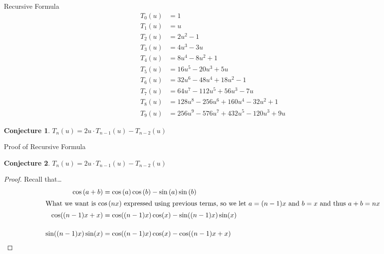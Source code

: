 \documentclass{beamer}
\newtheorem{conjecture}{Conjecture}
\begin{document}
\begin{frame}{Recursive Formula}
 \vspace{-18pt}
 \tiny{}
 \begin{align*}
  T_0(u) & = 1                                      \\
  T_1(u) & = u                                      \\
  T_2(u) & = 2u^2 - 1                               \\
  T_3(u) & = 4u^3 - 3u                              \\
  T_4(u) & = 8u^4 - 8 u^2 + 1                       \\
  T_5(u) & = 16u^5 - 20u^3 + 5u                     \\
  T_6(u) & = 32u^6 - 48u^4 + 18u^2 - 1              \\
  T_7(u) & = 64u^7 - 112u^5 + 56u^3 - 7u            \\
  T_8(u) & = 128u^8 - 256u^6 + 160u^4 - 32u^2 + 1   \\
  T_9(u) & = 256u^9 - 576u^7 + 432u^5 - 120u^3 + 9u
 \end{align*} \normalsize
 \hline
 \vspace{12pt}
 \begin{conjecture}\center
  \vspace{-12pt}
  $T_n(u)=2u\cdot T_{n-1}(u)-T_{n-2}(u)$
 \end{conjecture}
\end{frame}

\begin{frame}{Proof of Recursive Formula}
 \begin{conjecture}\center
  \vspace{-12pt}
  $T_n(u)=2u\cdot T_{n-1}(u)-T_{n-2}(u)$
 \end{conjecture}
 \pause
 \begin{proof}
  Recall that\dots
  \begin{align*}
   \cos{(a+b)}         & =\cos{(a)}\cos{(b)}-\sin{(a)}\sin{(b)}   \\
   \intertext{What we want is $\cos{(nx)}$ expressed using previous terms, so we let $a=(n-1)x$ and $b=x$ and thus $a+b=nx$}
   \cos ((n-1)x+x)     & =\cos((n-1)x)\cos(x)-\sin((n-1)x)\sin(x) \\[12pt]
   \sin((n-1)x)\sin(x) & =\cos((n-1)x)\cos(x) - \cos ((n-1)x+x)
  \end{align*}
 \end{proof}
\end{frame}
\end{document}
